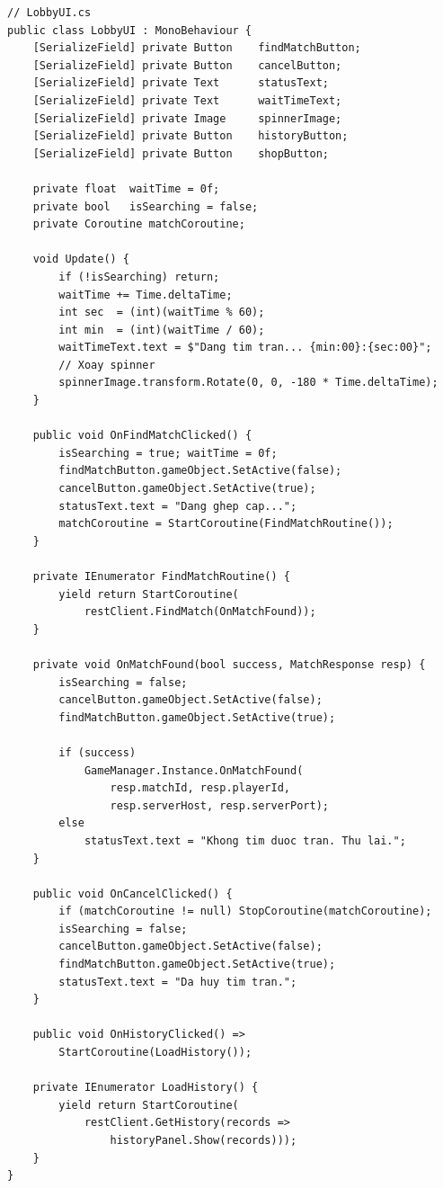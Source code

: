 \documentclass[12pt,a4paper]{report}
\begin{document}
\begin{lstlisting}[style=bashStyle, caption={LobbyUI --- màn hình chờ matchmaking với animation}, label={lst:lobbyui}]
// LobbyUI.cs
public class LobbyUI : MonoBehaviour {
    [SerializeField] private Button    findMatchButton;
    [SerializeField] private Button    cancelButton;
    [SerializeField] private Text      statusText;
    [SerializeField] private Text      waitTimeText;
    [SerializeField] private Image     spinnerImage;
    [SerializeField] private Button    historyButton;
    [SerializeField] private Button    shopButton;

    private float  waitTime = 0f;
    private bool   isSearching = false;
    private Coroutine matchCoroutine;

    void Update() {
        if (!isSearching) return;
        waitTime += Time.deltaTime;
        int sec  = (int)(waitTime % 60);
        int min  = (int)(waitTime / 60);
        waitTimeText.text = $"Dang tim tran... {min:00}:{sec:00}";
        // Xoay spinner
        spinnerImage.transform.Rotate(0, 0, -180 * Time.deltaTime);
    }

    public void OnFindMatchClicked() {
        isSearching = true; waitTime = 0f;
        findMatchButton.gameObject.SetActive(false);
        cancelButton.gameObject.SetActive(true);
        statusText.text = "Dang ghep cap...";
        matchCoroutine = StartCoroutine(FindMatchRoutine());
    }

    private IEnumerator FindMatchRoutine() {
        yield return StartCoroutine(
            restClient.FindMatch(OnMatchFound));
    }

    private void OnMatchFound(bool success, MatchResponse resp) {
        isSearching = false;
        cancelButton.gameObject.SetActive(false);
        findMatchButton.gameObject.SetActive(true);

        if (success)
            GameManager.Instance.OnMatchFound(
                resp.matchId, resp.playerId,
                resp.serverHost, resp.serverPort);
        else
            statusText.text = "Khong tim duoc tran. Thu lai.";
    }

    public void OnCancelClicked() {
        if (matchCoroutine != null) StopCoroutine(matchCoroutine);
        isSearching = false;
        cancelButton.gameObject.SetActive(false);
        findMatchButton.gameObject.SetActive(true);
        statusText.text = "Da huy tim tran.";
    }

    public void OnHistoryClicked() =>
        StartCoroutine(LoadHistory());

    private IEnumerator LoadHistory() {
        yield return StartCoroutine(
            restClient.GetHistory(records =>
                historyPanel.Show(records)));
    }
}
\end{lstlisting}
\end{document}
